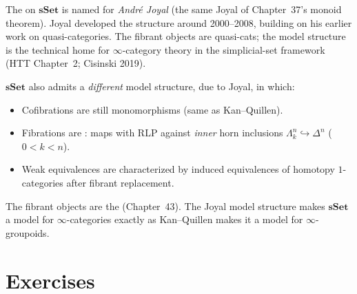 \begin{nameorigin}
The  on $\mathbf{sSet}$ is named for
\emph{André Joyal} (the same Joyal of Chapter~37's monoid theorem).
Joyal developed the structure around 2000--2008, building on his
earlier work on quasi-categories. The fibrant objects are quasi-cats;
the model structure is the technical home for $\infty$-category theory
in the simplicial-set framework (HTT Chapter~2; Cisinski 2019).
\end{nameorigin}

\begin{remark}
\label{rem:joyal-preview}
$\mathbf{sSet}$ also admits a \emph{different} model structure, due to
Joyal, in which:
\begin{itemize}
  \item Cofibrations are still monomorphisms (same as Kan--Quillen).
  \item Fibrations are : maps with RLP against
        \emph{inner} horn inclusions $\Lambda^n_k \hookrightarrow \Delta^n$
        ($0 < k < n$).
  \item Weak equivalences are characterized by induced equivalences of
        homotopy $1$-categories after fibrant replacement.
\end{itemize}
The fibrant objects are the  (Chapter~43). The
Joyal model structure makes $\mathbf{sSet}$ a model for $\infty$-categories
exactly as Kan--Quillen makes it a model for $\infty$-groupoids.
\end{remark}


\section{Exercises}
\label{sec:model-exercises}

